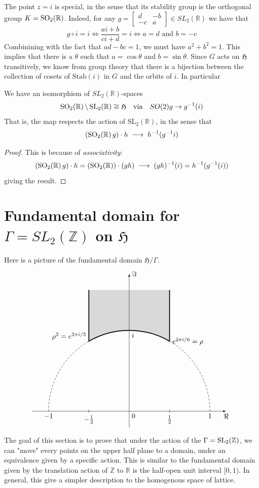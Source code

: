 The point $z = i$ is special, in the sense that its stability group is the orthogonal group $K =\SO2$. Indeed, for any \(g = \begin{bmatrix}d & -b \\ -c & a\end{bmatrix} \in SL_{2}(\mathbb{R})\)  we have
that
\[g \circ i = i \Leftrightarrow \dfrac{ai+b}{ci+d }=i \Leftrightarrow a=d \text{ and } b = -c \]
Combinining with the fact that $ad-bc=1$, we must have $a^2 + b^2=1$. This implies that there is a $\theta$ such that $a = \cos\theta$ and $b = \sin \theta$.
Since $G$ acts on $\operatorname{\mathfrak{H}}$ transitively, we know from group theory that there is a bijection between the collection of cosets of
$\text{Stab}(i)$ in $G$ and the orbits of $i$. In particular
\begin{prop}\label{upper-group}
  We have an isomorphism of \(SL_{2}(\mathbb{R})\)-spaces
  \[
    \SO2\backslash\SLR \cong \mathfrak{H} \quad \text{via} \quad  SO(2)g \to g^{-1}(i)
  \]
  That is, the map respects the action of \(\text{SL}_{2}(\mathbb{R})\), in the sense that
  \[
    (\SO2 g)\cdot h \;\longrightarrow\; h^{-1}(g^{-1}i)
  \]
\end{prop}
\begin{proof}
  This is because of \textit{associativity}:
  \[
    (\SO2 g)\cdot h  = (\SO2)\cdot (gh)  \;\longrightarrow\; (gh)^{-1}(i) = h^{-1}(g^{-1}(i))
  \]
  giving the result.
\end{proof}
\section{Fundamental domain for $\Gamma = SL_2(\mathbb{Z})$ on $\mathfrak{H}$}
Here is a picture of the fundamental domain $\mathfrak{H}/\Gamma$.
\[
  \begin{tikzpicture}[scale=4]
    \draw[densely dashed] (1,0) arc (0:60:1) (-1,0) arc (180:120:1);
    \draw[very thick, fill=gray!30] (.5,1.5) --node[right, pos=1]{$e^{2\pi i/6}=\rho$} (60:1) arc (60:120:1)
    --node[left, pos=.1]{$\rho^2=e^{2\pi i/3}$} (-.5,1.5);
    \draw[-latex] (-1.2,0) -- (1.2,0)node[below]{$\Re$};
    \draw[-latex] (0,-.2) -- (0,1.7)node[right]{$\Im$};
    \path(-1,0) --node[below, pos=0]{$-1$}node[below right, pos=.5]{0}node[below, pos=1]{1} (1,0)
    (0,1)node[below right]{$i$};
    \draw(-.5,.02)--(-.5,-.02)node[below]{$-\frac{1}{2}$}(.5,.02)--(.5,-.02)node[below]{$\frac{1}{2}$};
  \end{tikzpicture}\]
The goal of this section is to prove that under the action of the $\Gamma = \operatorname{SL_2(\mathbb{Z})}$, we can "move"
every points on the upper half plane to a domain, under an equivalence given by a specific action.
This is similar to the fundamental domain given by the translation action of $\mathbb{Z}$ to $\mathbb{R}$ is the half-open
unit interval $[0,1)$. In general, this give a simpler description to the homogenous space of lattice.

